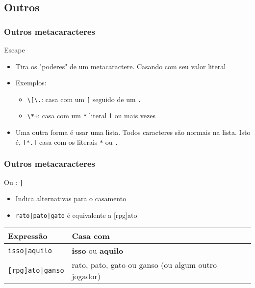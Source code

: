 \documentclass{beamer}
\begin{document}
\subsection{Outros}
\begin{frame}[fragile]
 \frametitle{Outros metacaracteres}
 \begin{block}{Escape}
  \begin{itemize}
   \item Tira os "poderes" de um metacaractere. Casando com seu valor literal 
	\pause
   \item Exemplos:
  \begin{itemize}
   \item \verb=\[\.=: casa com um \verb=[= seguido de um \verb=.=
    \pause
   \item \verb=\*+=: casa com um \verb=*= literal 1 ou mais vezes
  \end{itemize}
  \pause
  \item Uma outra forma é usar uma lista. Todos caracteres são normais na lista. Isto é, \verb=[*.]= casa com os literais \verb=*= ou \verb=.=
 \end{itemize}
 \end{block}
\end{frame}

\begin{frame}[fragile]
 \frametitle{Outros metacaracteres}
 \begin{block}{Ou : \texttt{|}}
  \begin{itemize}
   \item Indica alternativas para o casamento
   \item \verb=rato|pato|gato= é equivalente a [rpg]ato
  \end{itemize}

  \pause
  \begin{center}
   \begin{tabular}{|l|l|}
	\hline
	\textbf{Expressão} & \textbf{Casa com} \\
	\hline
	\verb=isso|aquilo= & \textbf{isso} ou \textbf{aquilo} \\
	\hline
	\verb=[rpg]ato|ganso= & rato, pato, gato ou ganso {\tiny(ou algum outro jogador)} \\
	\hline
   \end{tabular}
  \end{center}
 \end{block}
\end{frame}
\end{document}
